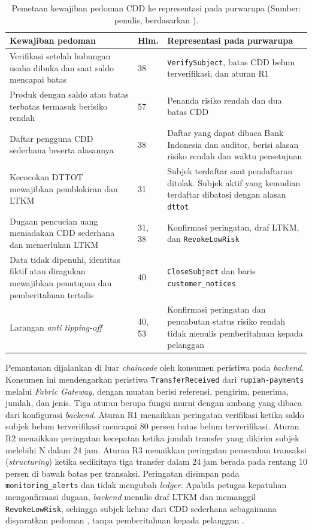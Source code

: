 \begin{table}[H]
    \caption[Pemetaan kewajiban pedoman CDD ke representasi pada purwarupa.]{Pemetaan kewajiban pedoman CDD ke representasi pada purwarupa (Sumber: penulis, berdasarkan \cite{bi2023pedoman}).}
    \label{tab:ch3-cdd-kewajiban}
    \centering
    \small
    \begin{tabular}{@{}p{4.9cm}p{1.3cm}p{6.9cm}@{}}
        \toprule
        \textbf{Kewajiban pedoman} & \textbf{Hlm.} & \textbf{Representasi pada purwarupa} \\
        \midrule
        Verifikasi setelah hubungan usaha dibuka dan saat saldo mencapai batas & 38 & \texttt{VerifySubject}, batas CDD belum terverifikasi, dan aturan R1 \\
        Produk dengan saldo atau batas terbatas termasuk berisiko rendah & 57 & Penanda risiko rendah dan dua batas CDD \\
        Daftar pengguna CDD sederhana beserta alasannya & 38 & Daftar yang dapat dibaca Bank Indonesia dan auditor, berisi alasan risiko rendah dan waktu persetujuan \\
        Kecocokan DTTOT mewajibkan pemblokiran dan LTKM & 31 & Subjek terdaftar saat pendaftaran ditolak. Subjek aktif yang kemudian terdaftar dibatasi dengan alasan \texttt{dttot} \\
        Dugaan pencucian uang meniadakan CDD sederhana dan memerlukan LTKM & 31, 38 & Konfirmasi peringatan, draf LTKM, dan \texttt{RevokeLowRisk} \\
        Data tidak dipenuhi, identitas fiktif atau diragukan mewajibkan penutupan dan pemberitahuan tertulis & 40 & \texttt{CloseSubject} dan baris \texttt{customer\_notices} \\
        Larangan \textit{anti tipping-off} & 40, 53 & Konfirmasi peringatan dan pencabutan status risiko rendah tidak menulis pemberitahuan kepada pelanggan \\
        \bottomrule
    \end{tabular}
\end{table}

Pemantauan dijalankan di luar \textit{chaincode} oleh konsumen peristiwa pada \textit{backend}. Konsumen ini mendengarkan peristiwa \texttt{TransferReceived} dari \texttt{rupiah-payments} melalui \textit{Fabric Gateway}, dengan muatan berisi referensi, pengirim, penerima, jumlah, dan jenis. Tiga aturan berupa fungsi murni dengan ambang yang dibaca dari konfigurasi \textit{backend}. Aturan R1 menaikkan peringatan verifikasi ketika saldo subjek belum terverifikasi mencapai 80 persen batas belum terverifikasi. Aturan R2 menaikkan peringatan kecepatan ketika jumlah transfer yang dikirim subjek melebihi N dalam 24 jam. Aturan R3 menaikkan peringatan pemecahan transaksi (\textit{structuring}) ketika sedikitnya tiga transfer dalam 24 jam berada pada rentang 10 persen di bawah batas per transaksi. Peringatan disimpan pada \texttt{monitoring\_alerts} dan tidak mengubah \textit{ledger}. Apabila petugas kepatuhan mengonfirmasi dugaan, \textit{backend} menulis draf LTKM dan memanggil \texttt{RevokeLowRisk}, sehingga subjek keluar dari CDD sederhana sebagaimana disyaratkan pedoman \cite[hlm.~38]{bi2023pedoman}, tanpa pemberitahuan kepada pelanggan \cite[hlm.~53]{bi2023pedoman}.

